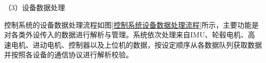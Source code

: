 
（3）设备数据处理

控制系统的设备数据处理流程如图\ref{控制系统设备数据处理流程}所示，主要功能是对各类外设传入的数据进行解析与管理。系统依次处理来自IMU、轮毂电机、高速电机、进动电机、控制器以及上位机的数据，按设定顺序从各数据队列获取数据并按照各设备的通信协议进行解析校验。

